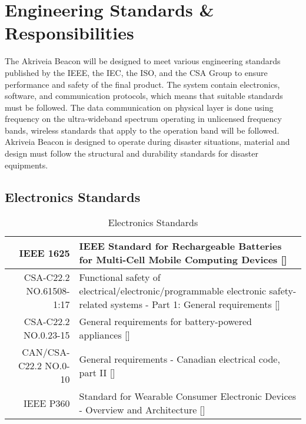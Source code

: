 %

\setcounter{section}{3}
\section{Engineering Standards \& Responsibilities}
\bigskip
The Akriveia Beacon will be designed to meet various engineering standards published by the IEEE, the IEC, the ISO, and the CSA Group to ensure performance and safety of the final product. The system contain electronics, software, and communication protocols, which means that suitable standards must be followed. The data communication on physical layer is done using frequency on the ultra-wideband spectrum operating in unlicensed frequency bands, wireless standards that apply to the operation band will be followed. Akriveia Beacon is designed to operate during disaster situations, material and design must follow the structural and durability standards for disaster equipments. 


\subsection{Electronics Standards}
\bgroup
\def\arraystretch{1.5}
\begin{table}[H]
\centering
\begin{tabular}{ |p{3cm} p{11cm} | }
\hline
\multicolumn{1}{|r|}{IEEE 1625} & IEEE Standard for Rechargeable Batteries for Multi-Cell Mobile Computing Devices []\\ 
\hline
\multicolumn{1}{|r|}{CSA-C22.2 NO.61508-1:17} & Functional safety of electrical/electronic/programmable electronic safety-related systems - Part 1: General requirements []\\ 
\hline
\multicolumn{1}{|r|}{CSA-C22.2 NO.0.23-15} & General requirements for battery-powered appliances []\\  
\hline
\multicolumn{1}{|r|}{CAN/CSA-C22.2 NO.0-10} & General requirements - Canadian electrical code, part II []\\ 
\hline
\multicolumn{1}{|r|}{IEEE P360} & Standard for Wearable Consumer Electronic Devices - Overview and Architecture [] \\  
\hline
\end{tabular}
\caption{Electronics Standards}
\end{table}	
\medskip


